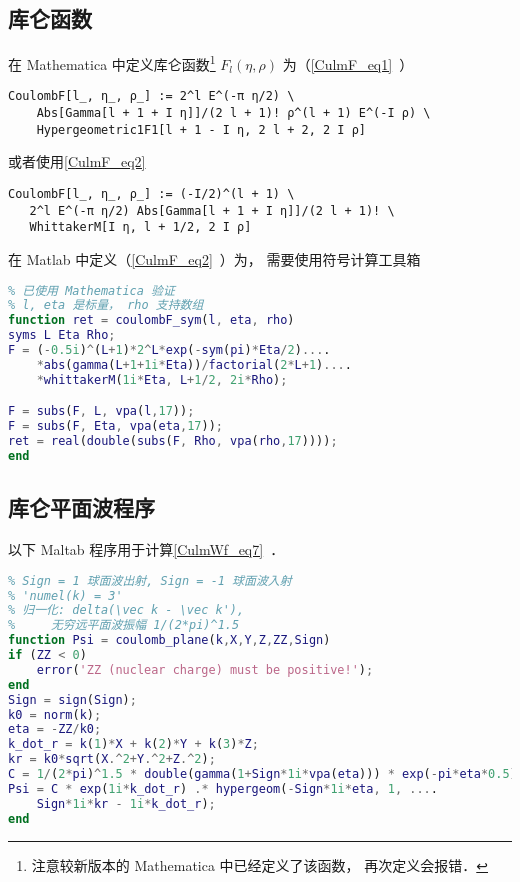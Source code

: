 


\subsection{库仑函数}
在 Mathematica 中定义库仑函数\footnote{注意较新版本的 Mathematica 中已经定义了该函数， 再次定义会报错．} $F_l(\eta, \rho)$ 为（\autoref{CulmF_eq1}~） %
\begin{lstlisting}[language=mma]
CoulombF[l_, η_, ρ_] := 2^l E^(-π η/2) \
    Abs[Gamma[l + 1 + I η]]/(2 l + 1)! ρ^(l + 1) E^(-I ρ) \
    Hypergeometric1F1[l + 1 - I η, 2 l + 2, 2 I ρ]
\end{lstlisting}
或者使用\autoref{CulmF_eq2}~\upref{CulmF} %
\begin{lstlisting}[language=mma]
CoulombF[l_, η_, ρ_] := (-I/2)^(l + 1) \
   2^l E^(-π η/2) Abs[Gamma[l + 1 + I η]]/(2 l + 1)! \
   WhittakerM[I η, l + 1/2, 2 I ρ]
\end{lstlisting}

在 Matlab 中定义（\autoref{CulmF_eq2}~\upref{CulmF}）为， 需要使用符号计算工具箱 %
\begin{lstlisting}[language=matlab, caption=coulombF\_sym.m]
% 第一类库仑函数 F_l(eta, rho)
% 已使用 Mathematica 验证
% l, eta 是标量， rho 支持数组
function ret = coulombF_sym(l, eta, rho)
syms L Eta Rho;
F = (-0.5i)^(L+1)*2^L*exp(-sym(pi)*Eta/2)....
    *abs(gamma(L+1+1i*Eta))/factorial(2*L+1)....
    *whittakerM(1i*Eta, L+1/2, 2i*Rho);

F = subs(F, L, vpa(l,17));
F = subs(F, Eta, vpa(eta,17));
ret = real(double(subs(F, Rho, vpa(rho,17))));
end
\end{lstlisting}

\subsection{库仑平面波程序}
以下 Maltab 程序用于计算\autoref{CulmWf_eq7}~．
\begin{lstlisting}[language=matlab, caption=coulomb\_plane.m]
% 直角坐标系的库仑平面波
% Sign = 1 球面波出射, Sign = -1 球面波入射
% 'numel(k) = 3'
% 归一化: delta(\vec k - \vec k'),
%     无穷远平面波振幅 1/(2*pi)^1.5
function Psi = coulomb_plane(k,X,Y,Z,ZZ,Sign)
if (ZZ < 0)
    error('ZZ (nuclear charge) must be positive!');
end
Sign = sign(Sign);
k0 = norm(k);
eta = -ZZ/k0;
k_dot_r = k(1)*X + k(2)*Y + k(3)*Z;
kr = k0*sqrt(X.^2+Y.^2+Z.^2);
C = 1/(2*pi)^1.5 * double(gamma(1+Sign*1i*vpa(eta))) * exp(-pi*eta*0.5);
Psi = C * exp(1i*k_dot_r) .* hypergeom(-Sign*1i*eta, 1, ....
    Sign*1i*kr - 1i*k_dot_r);
end
\end{lstlisting}

